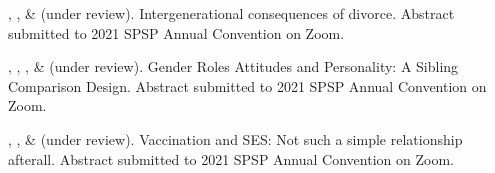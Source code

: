 
%
\item \kl, \jt, \& \meb (under review). Intergenerational consequences of divorce. Abstract submitted to 2021 SPSP Annual Convention on Zoom.
%
\item \sherrym, \yrh, \jt, \& \meb (under review). Gender Roles Attitudes and Personality: A Sibling Comparison Design.  Abstract submitted to 2021 SPSP Annual Convention on Zoom.
%
\item \jt, \kl, \& \meb (under review). Vaccination and SES: Not such a simple relationship afterall. Abstract submitted to 2021 SPSP Annual Convention on Zoom.
